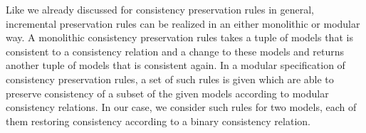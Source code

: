 Like we already discussed for \glspl{consistency preservation rule} in general, incremental preservation rules can be realized in an either monolithic or modular way.
A monolithic consistency preservation rules takes a tuple of models that is consistent to a consistency relation and a change to these models and returns another tuple of models that is consistent again.
In a modular specification of \glspl{consistency preservation rule}, a set of such rules is given which are able to preserve consistency of a subset of the given models according to modular consistency relations.
In our case, we consider such rules for two models, each of them restoring consistency according to a binary consistency relation.


